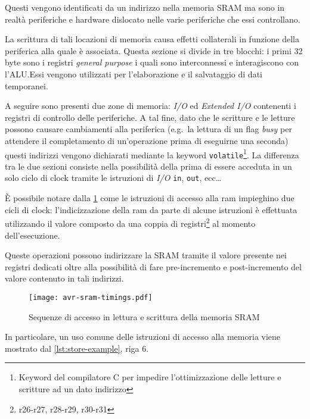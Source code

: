 Questi vengono identificati da un indirizzo nella memoria SRAM ma sono in realtà periferiche e hardware dislocato nelle varie periferiche che essi controllano.

La scrittura di tali locazioni di memoria causa effetti collaterali in funzione della periferica alla quale è associata. Questa sezione si divide in tre blocchi: i primi 32 byte sono i registri \textit{general purpose} i quali sono interconnessi e interagiscono con l'ALU.\@ Essi vengono utilizzati per l'elaborazione e il salvataggio di dati temporanei.

A seguire sono presenti due zone di memoria: \textit{I/O} ed \textit{Extended I/O} contenenti i registri di controllo delle periferiche. A tal fine, dato che le scritture e le letture possono causare cambiamenti alla periferica (e.g.\ la lettura di un flag \textit{busy} per attendere il completamento di un'operazione prima di eseguirne una seconda) questi indirizzi vengono dichiarati mediante la keyword \texttt{volatile}\footnote{Keyword del compilatore C per impedire l'ottimizzazione delle letture e scritture ad un dato indirizzo}. La differenza tra le due sezioni consiste nella possibilità della prima di essere acceduta in un solo ciclo di clock tramite le istruzioni di \textit{I/O} \texttt{in}, \texttt{out}, ecc\ldots

È possibile notare dalla \cref{fig:avr-sram-timings} come le istruzioni di accesso alla ram impieghino due cicli di clock: l'indicizzazione della ram da parte di alcune istruzioni è effettuata utilizzando il valore composto da una coppia di registri\footnote{r26-r27, r28-r29, r30-r31} al momento dell'esecuzione. 

Queste operazioni possono indirizzare la SRAM tramite il valore presente nei registri dedicati oltre alla possibilità di fare pre-incremento e post-incremento del valore contenuto in tali indirizzi.

\begin{figure}[b]
    \centering
    \texttt{[image: avr-sram-timings.pdf]}
    \caption[Immagine rielaborata a partire dalla fig. 8-4 del documento~\cite{avr:m328p}]{Sequenze di accesso in lettura e scrittura della memoria SRAM\cite[fig 8-4]{avr:m328p}}\label{fig:avr-sram-timings}
\end{figure}

In particolare, un uso comune delle istruzioni di accesso alla memoria viene mostrato dal \cref{lst:store-example}, riga 6.

